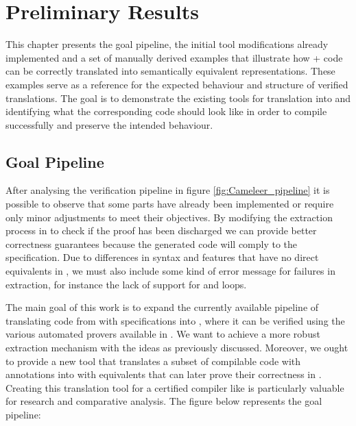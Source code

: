 
%

\chapter{Preliminary Results}
\label{cha:Preliminary_Results}

This chapter presents the goal pipeline, the initial tool modifications already implemented and a set of manually derived examples that 
illustrate how \ocaml + \gospel code can be correctly translated into 
semantically equivalent \cml representations. These examples serve as a reference for the expected behaviour and structure of verified 
translations. The goal is to demonstrate the existing tools for translation into \cml and identifying what the corresponding \cml code 
should look like in order to compile successfully and preserve the intended behaviour.

\section{Goal Pipeline}

After analysing the verification pipeline in figure \ref{fig:Cameleer_pipeline} it is possible to observe that some parts have already been 
implemented or require only minor adjustments to meet their objectives. By modifying the extraction process in \whythree to check if the 
proof has been discharged we can provide better correctness guarantees because the generated \cml code will comply to the specification. 
Due to differences in syntax and features that have no direct equivalents in \cml, we must also include some kind of error message for 
failures in extraction, for instance the lack of support for  and  loops.

The main goal of this work is to expand the currently available pipeline of translating code from \ocaml with \gospel specifications 
into \whyml, where it can be verified using the various automated provers available in \whythree. We want to achieve 
a more robust extraction mechanism with the ideas as previously discussed. Moreover, we ought to provide a new tool that 
translates a subset of compilable \cml code with \gospel annotations into \ocaml with \gospel equivalents that can later
prove their correctness in \cameleer. Creating this translation tool for a certified compiler like \cml is particularly valuable for 
research and comparative analysis. The figure below represents the goal pipeline:

